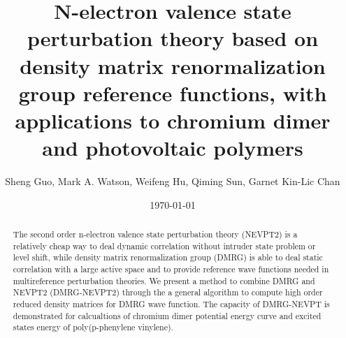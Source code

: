 \documentclass[
 aip,
 jcp,
 numerical ,
 reprint, %
]{revtex4-1}
\begin{document}
\title{N-electron valence state perturbation theory based on density matrix renormalization group reference functions, with applications to chromium dimer and photovoltaic polymers}
\author{Sheng Guo, Mark A. Watson, Weifeng Hu, Qiming Sun, Garnet Kin-Lic Chan}

\begin{abstract}

The second order n-electron valence state perturbation theory (NEVPT2) is a relatively cheap way to deal dynamic correlation without intruder state problem or level shift, while density matrix renormalization group (DMRG) is able to deal static correlation with a large active space and to provide reference wave functions needed in multireference perturbation theories.
We present a method to combine DMRG and NEVPT2 (DMRG-NEVPT2) through the a general algorithm to compute high order reduced density matrices for DMRG wave function. The capacity of DMRG-NEVPT is demonstrated for calcualtions of chromium dimer potential energy curve and excited states energy of poly(p-phenylene vinylene).

\end{abstract}

\date{\today}

\maketitle

















{}
\end{document}
